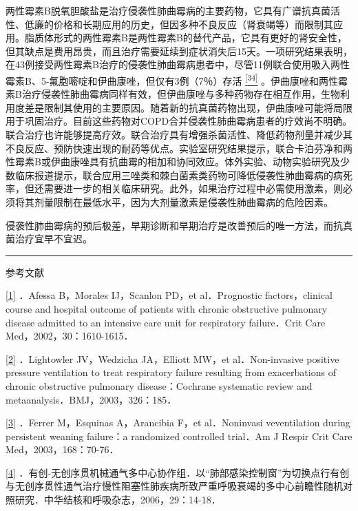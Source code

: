 两性霉素B脱氧胆酸盐是治疗侵袭性肺曲霉病的主要药物，它具有广谱抗真菌活性、低廉的价格和长期应用的历史，但因多种不良反应（肾衰竭等）而限制其应用。脂质体形式的两性霉素B是两性霉素B的替代产品，它具有更好的肾安全性，但其缺点是费用昂贵，而且治疗需要延续到症状消失后15天。一项研究结果表明，在43例接受两性霉素B治疗的侵袭性肺曲霉病患者中，尽管11例联合使用吸入两性霉素B、5-氟胞嘧啶和伊曲康唑，但仅有3例（7％）存活
\protect\hyperlink{text00012.htmlux5cux23ch34-11}{\textsuperscript{{[}34{]}}}
。伊曲康唑和两性霉素B治疗侵袭性肺曲霉病同样有效，但伊曲康唑与多种药物存在相互作用，生物利用度差是限制其使用的主要原因。随着新的抗真菌药物出现，伊曲康唑可能将局限用于巩固治疗。目前这些药物对COPD合并侵袭性肺曲霉病患者的疗效尚不明确。联合治疗也许能够提高疗效。联合治疗具有增强杀菌活性、降低药物剂量并减少其不良反应、预防快速出现的耐药等优点。实验室研究结果提示，联合卡泊芬净和两性霉素B或伊曲康唑具有抗曲霉的相加和协同效应。体外实验、动物实验研究及少数临床报道提示，联合应用三唑类和棘白菌素类药物可降低侵袭性肺曲霉病的病死率，但还需要进一步的相关临床研究。此外，如果治疗过程中必需使用激素，则必须将其剂量限制在最低水平，因为大剂量激素是侵袭性肺曲霉病的危险因素。

侵袭性肺曲霉病的预后极差，早期诊断和早期治疗是改善预后的唯一方法，而抗真菌治疗宜早不宜迟。

\begin{center}\rule{0.5\linewidth}{\linethickness}\end{center}

参考文献

\protect\hyperlink{text00012.htmlux5cux23ch1-11-back}{{[}1{]}} ．Afessa
B，Morales IJ，Scanlon PD，et al．Prognostic factors，clinical course
and hospital outcome of patients with chronic obstructive pulmonary
disease admitted to an intensive care unit for respiratory failure．Crit
Care Med，2002，30：1610-1615．

\protect\hyperlink{text00012.htmlux5cux23ch2-11-back}{{[}2{]}}
．Lightowler JV，Wedzicha JA，Elliott MW，et al．Non-invasive positive
pressure ventilation to treat respiratory failure resulting from
exacerbations of chronic obstructive pulmonary disease：Cochrane
systematic review and metaanalysis．BMJ，2003，326：185．

\protect\hyperlink{text00012.htmlux5cux23ch3-11-back}{{[}3{]}} ．Ferrer
M，Esquinas A，Arancibia F，et al．Noninvasi veventilation during
persistent weaning failure：a randomized controlled trial．Am J Respir
Crit Care Med，2003，168：70-76．

\protect\hyperlink{text00012.htmlux5cux23ch4-11-back}{{[}4{]}}
．有创-无创序贯机械通气多中心协作组．以“肺部感染控制窗”为切换点行有创与无创序贯性通气治疗慢性阻塞性肺疾病所致严重呼吸衰竭的多中心前瞻性随机对照研究．中华结核和呼吸杂志，2006，29：14-18．


